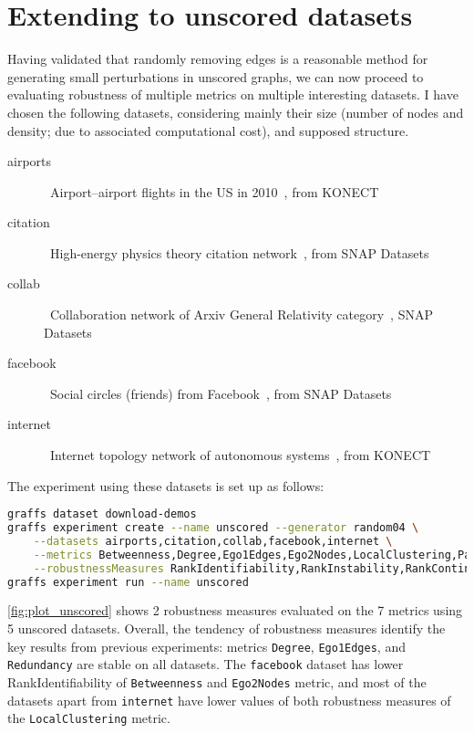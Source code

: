 \section{Extending to unscored datasets}

Having validated that randomly removing edges is a reasonable method for generating small perturbations in unscored graphs, we can now proceed to evaluating robustness of multiple metrics on multiple interesting datasets.
I have chosen the following datasets, considering mainly their size (number of nodes and density; due to associated computational cost), and supposed structure.

\begin{description}
    \item[airports]\ Airport–airport flights in the US in 2010~\cite{konect:2016:opsahl-usairport,konect:opsahl11}, from KONECT~\cite{Kunegis2013}
    \item[citation]\ High-energy physics theory citation network~\cite{LeskovecGraphsTimeDensification2005,GehrkeOverview2003KDD2003}, from SNAP Datasets~\cite{Large2016}
    \item[collab]\ Collaboration network of Arxiv General Relativity category~\cite{LeskovecGraphEvolutionDensification2007}, SNAP Datasets
    \item[facebook]\ Social circles (friends) from Facebook~\cite{NIPS2012_4532}, from SNAP Datasets
    \item[internet]\ Internet topology network of autonomous systems~\cite{konect:zhang05,konect:2016:topology}, from KONECT
\end{description}



The experiment using these datasets is set up as follows:
\begin{lstlisting}[language=bash]
graffs dataset download-demos
graffs experiment create --name unscored --generator random04 \
    --datasets airports,citation,collab,facebook,internet \
    --metrics Betweenness,Degree,Ego1Edges,Ego2Nodes,LocalClustering,PageRank,Redundancy \
    --robustnessMeasures RankIdentifiability,RankInstability,RankContinuity
graffs experiment run --name unscored
\end{lstlisting}



\autoref{fig:plot_unscored} shows 2 robustness measures evaluated on the 7 metrics using 5 unscored datasets.
Overall, the tendency of robustness measures identify the key results from previous experiments: metrics \texttt{Degree}, \texttt{Ego1Edges}, and \texttt{Redundancy} are stable on all datasets.
The \texttt{facebook} dataset has lower RankIdentifiability of \texttt{Betweenness} and \texttt{Ego2Nodes} metric, and most of the datasets apart from \texttt{internet} have lower values of both robustness measures of the \texttt{LocalClustering} metric.


